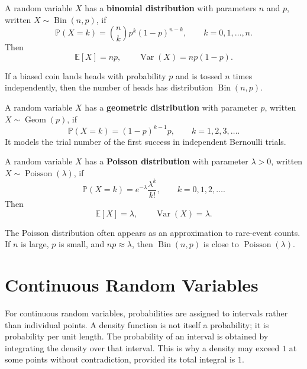 \begin{definition}
A random variable $X$ has a \textbf{binomial distribution} with parameters $n$ and $p$, written $X\sim\operatorname{Bin}(n,p)$, if
\[
    \mathbb{P}(X=k)=\binom{n}{k}p^k(1-p)^{n-k},
    \qquad
    k=0,1,\dots,n.
\]
Then
\[
    \mathbb{E}[X]=np,
    \qquad
    \operatorname{Var}(X)=np(1-p).
\]
\end{definition}

\begin{example}
If a biased coin lands heads with probability $p$ and is tossed $n$ times independently, then the number of heads has distribution $\operatorname{Bin}(n,p)$.
\end{example}

\begin{definition}
A random variable $X$ has a \textbf{geometric distribution} with parameter $p$, written $X\sim\operatorname{Geom}(p)$, if
\[
    \mathbb{P}(X=k)=(1-p)^{k-1}p,
    \qquad
    k=1,2,3,\dots.
\]
It models the trial number of the first success in independent Bernoulli trials.
\end{definition}

\begin{definition}
A random variable $X$ has a \textbf{Poisson distribution} with parameter $\lambda>0$, written $X\sim\operatorname{Poisson}(\lambda)$, if
\[
    \mathbb{P}(X=k)=e^{-\lambda}\frac{\lambda^k}{k!},
    \qquad
    k=0,1,2,\dots.
\]
Then
\[
    \mathbb{E}[X]=\lambda,
    \qquad
    \operatorname{Var}(X)=\lambda.
\]
\end{definition}

\begin{remark}
The Poisson distribution often appears as an approximation to rare-event counts. If $n$ is large, $p$ is small, and $np\approx\lambda$, then $\operatorname{Bin}(n,p)$ is close to $\operatorname{Poisson}(\lambda)$.
\end{remark}

\section{Continuous Random Variables}


For continuous random variables, probabilities are assigned to intervals rather than individual points. A density function is not itself a probability; it is probability per unit length. The probability of an interval is obtained by integrating the density over that interval. This is why a density may exceed $1$ at some points without contradiction, provided its total integral is $1$.

